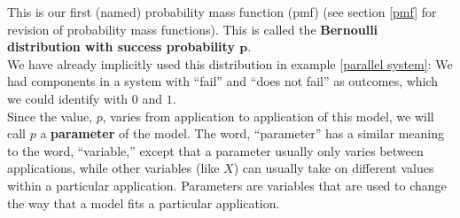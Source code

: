 \noindent This is our first (named) probability mass function (pmf) (see section \ref{pmf} for revision of probability mass functions). This is called the \textbf{Bernoulli distribution with success probability $\boldsymbol{p}$}. \label{bernoulli distribution} \\

\noindent We have already implicitly used this distribution in example \ref{parallel system}: We had components in a system with ``fail'' and ``does not fail'' as outcomes, which we could identify with $0$ and $1$. \\

\noindent Since the value, $p$, varies from application to application of this model, we will call $p$ a \textbf{parameter} of the model. The word, ``parameter'' has a similar meaning to the word, ``variable,'' except that a parameter usually only varies between applications, while other variables (like $X$) can usually take on different values within a particular application. Parameters are variables that are used to change the way that a model fits a particular application. \label{parameter}

